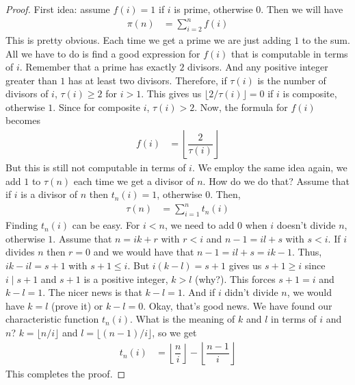 \documentclass{subfiles}
\begin{document}
			\begin{proof}
				First idea: assume $f(i)=1$ if $i$ is prime, otherwise $0$. Then we will have
					\begin{align*}
						\pi(n) & = \sum_{i=2}^{n}f(i)
					\end{align*}
				This is pretty obvious. Each time we get a prime we are just adding $1$ to the sum. All we have to do is find a good expression for $f(i)$ that is computable in terms of $i$. Remember that  a prime has exactly $2$ divisors. And any positive integer greater than $1$ has at least two divisors. Therefore, if $\tau(i)$ is the number of divisors of $i$, $\tau(i)\geq2$ for $i>1$. This gives us $\lfloor 2/\tau(i)\rfloor=0$ if $i$ is composite, otherwise $1$. Since for composite $i$, $\tau(i)>2$. Now, the formula for $f(i)$ becomes
					\begin{align*}
						f(i) & = \left\lfloor\dfrac{2}{\tau(i)}\right\rfloor
					\end{align*}
				But this is still not computable in terms of $i$. We employ the same idea again, we add $1$ to $\tau(n)$ each time we get a divisor of $n$. How do we do that? Assume that if $i$ is a divisor of $n$ then $t_n(i)=1$, otherwise $0$. Then,
					\begin{align*}
						\tau(n) & = \sum_{i=1}^{n}t_n(i)
					\end{align*}
				Finding $t_n(i)$ can be easy. For $i<n$, we need to add $0$ when $i$ doesn't divide $n$, otherwise $1$. Assume that $n=ik+r$ with $r<i$ and $n-1=il+s$ with $s<i$. If $i$ divides $n$ then $r=0$ and we would have that $n-1=il+s=ik-1$. Thus, $ik-il=s+1$ with $s+1\leq i$. But $i(k-l)=s+1$ gives us $s+1\geq i$ since $i\mid s+1$ and $s+1$ is a positive integer, $k>l$ (why?). This forces $s+1=i$ and $k-l=1$. The nicer news is that $k-l=1$. And if $i$ didn't divide $n$, we would have $k=l$ (prove it) or $k-l=0$. Okay, that's good news. We have found our characteristic function $t_n(i)$. What is the meaning of $k$ and $l$ in terms of $i$ and $n$? $k=\lfloor n/i\rfloor$ and $l=\lfloor (n-1)/i\rfloor$, so we get
					\begin{align*}
						t_n(i) & = \left\lfloor\dfrac{n}{i}\right\rfloor-\left\lfloor\dfrac{n-1}{i}\right\rfloor
					\end{align*}
				This completes the proof.
			\end{proof}
\end{document}
